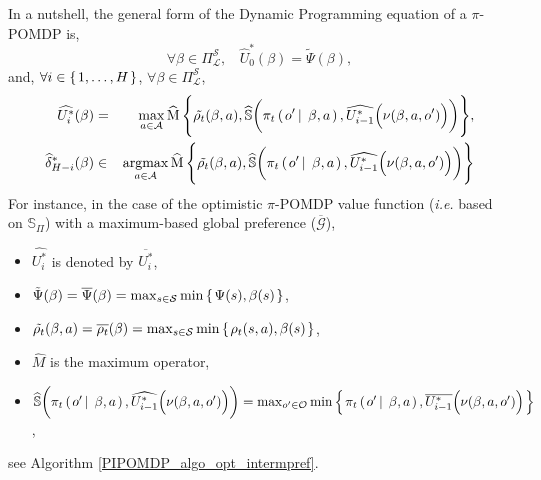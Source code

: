 In a nutshell, the general form of the Dynamic Programming equation of a $\pi$-POMDP is,
\[ \forall \beta \in \Pi^{\mathcal{S}}_{\mathcal{L}}, \ \ \ \ \widehat{U}^*_0(\beta) = \tilde{\Psi}(\beta),\]
and, $\forall i \in \left\{ \left. 1,\ldots,H \right. \right\}$, $\forall \beta \in \Pi^{\mathcal{S}}_{\mathcal{L}}$,
\begin{eqnarray}
\label{general_DP_piPOMDP} \widehat{U^*_{i}}(\beta) &=& \max_{a \in \mathcal{A}} \operatorname*{\widehat{M}} \Bigg\{ \tilde{\rho_t}(\beta,a), \widehat{\mathbb{S}}\bigg( \pi_t \left( \left. o' \, \right| \left. \, \beta, a \right. \right), \widehat{U^*_{i-1}} \Big( \nu( \beta,a,o') \Big) \bigg) \Bigg\},\\
\label{general_DP_piPOMDP_actSelec} \widehat{\delta}_{H-i}^*(\beta) &\in& \operatorname*{argmax}_{a \in \mathcal{A}} \operatorname*{\widehat{M}} \Bigg\{  \tilde{\rho_t}(\beta,a), \widehat{\mathbb{S}}\bigg( \pi_t \left( \left. o' \, \right| \left. \, \beta, a \right. \right), \widehat{U^*_{i-1}} \Big( \nu( \beta,a,o') \Big) \bigg) \Bigg\} 
\end{eqnarray}
For instance, in the case of the optimistic $\pi$-POMDP value function 
(\textit{i.e.} based on $\mathbb{S}_{\Pi}$) 
with a maximum-based global preference ($\overline{\mathcal{G}}$),
\begin{itemize}
\item $\widehat{U^*_{i}}$ is denoted by $\overline{U^*_i}$,
\item $\tilde{\Psi}(\beta) = \overline{\Psi}(\beta) = \max_{s \in \mathcal{S}} \min \left\{ \left.  \Psi(s), \beta(s)   \right. \right\}$,
\item $\tilde{\rho_t}(\beta,a) = \overline{\rho_t}(\beta) = \max_{s \in \mathcal{S}} \min \left\{ \left.  \rho_t(s,a), \beta(s)   \right. \right\}$,
\item $\widehat{M}$ is the maximum operator,
\item $\widehat{\mathbb{S}}\bigg( \pi_t \left( \left. o' \, \right| \left. \, \beta, a \right. \right), \widehat{U^*_{i-1}} \Big( \nu( \beta,a,o') \Big) \bigg) = \max_{o' \in \mathcal{O}} \min \left\{ \left.  \pi_t \left( \left.  o' \, \right| \left. \, \beta,a  \right. \right), \overline{U^*_{i-1}}\Big( \nu( \beta,a,o') \Big)   \right. \right\}$,
\end{itemize}
see Algorithm \ref{PIPOMDP_algo_opt_intermpref}.

